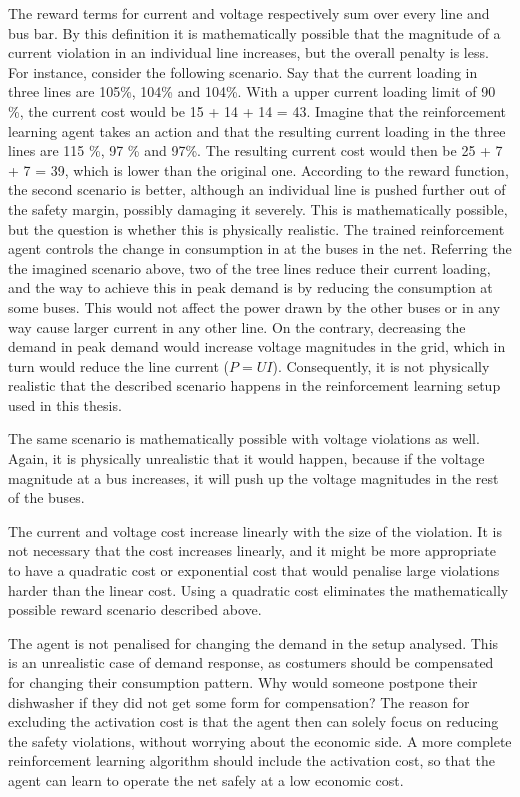 \documentclass[class=book, crop=false]{standalone}
\begin{document}
The reward terms for current and voltage respectively sum over every line and bus bar. By this definition it is mathematically possible that the magnitude of a current violation in an individual line increases, but the overall penalty is less. For instance, consider the following scenario. Say that the current loading in three lines are 105\%, 104\% and 104\%. With a upper current loading limit of 90 \%, the current cost would be 15 + 14 + 14 = 43. Imagine that the reinforcement learning agent takes an action and that the resulting current loading in the three lines are 115 \%, 97 \% and 97\%. The resulting current cost would then be 25 + 7 + 7 = 39, which  is lower than the original one. According to the reward function, the second scenario is better, although an individual line is pushed further out of the safety margin, possibly damaging it severely. This is mathematically possible, but the question is whether this is physically realistic. The trained reinforcement agent controls the change in consumption in at the buses in the net. Referring the the imagined scenario above, two of the tree lines reduce their current loading, and the way to achieve this in peak demand is by reducing the consumption at some buses. This would not affect the power drawn by the other buses or in any way cause larger current in any other line. On the contrary, decreasing the demand in peak demand would increase voltage magnitudes in the grid, which in turn would reduce the line current ($P = UI$). Consequently, it is not physically realistic that the described scenario happens in the reinforcement learning setup used in this thesis.

The same scenario is mathematically possible with voltage violations as well. Again, it is physically unrealistic that it would happen, because if the voltage magnitude at a bus increases, it will push up the voltage magnitudes in the rest of the buses.

The current and voltage cost increase linearly with the size of the violation. It is not necessary that the cost increases linearly, and it might be more appropriate to have a quadratic cost or exponential cost that would penalise large violations harder than the linear cost. Using a quadratic cost eliminates the mathematically possible reward scenario described above.

The agent is not penalised for changing the demand in the setup analysed. This is an unrealistic case of demand response, as costumers should be compensated for changing their consumption pattern. Why would someone postpone their dishwasher if they did not get some form for compensation? The reason for excluding the activation cost is that the agent then can solely focus on reducing the safety violations, without worrying about the economic side. A more complete reinforcement learning algorithm should include the activation cost, so that the agent can learn to operate the net safely at a low economic cost. 
\end{document}
